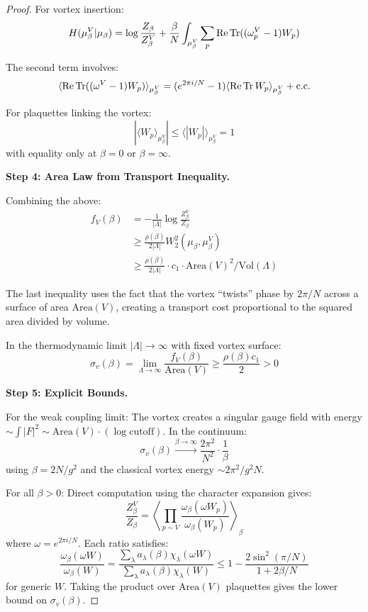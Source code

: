 \begin{proof}
For vortex insertion:
\[
H(\mu_\beta^V | \mu_\beta) = \log\frac{Z_\beta}{Z_\beta^V} + 
\frac{\beta}{N}\int_{\mu_\beta^V} \sum_p \operatorname{Re}\operatorname{Tr}((\omega_p^V - 1)W_p)
\]

The second term involves:
\[
\langle \operatorname{Re}\operatorname{Tr}((\omega^V - 1)W_p) \rangle_{\mu_\beta^V} = 
(e^{2\pi i/N} - 1)\langle \operatorname{Re}\operatorname{Tr} W_p \rangle_{\mu_\beta^V} + \text{c.c.}
\]

For plaquettes linking the vortex:
\[
|\langle W_p \rangle_{\mu_\beta^V}| \leq \langle |W_p| \rangle_{\mu_\beta^V} = 1
\]
with equality only at $\beta = 0$ or $\beta = \infty$.

\textbf{Step 4: Area Law from Transport Inequality.}

Combining the above:
\begin{align*}
f_V(\beta) &= -\frac{1}{|\Lambda|}\log\frac{Z_\beta^V}{Z_\beta} \\
&\geq \frac{\rho(\beta)}{2|\Lambda|} W_2^2(\mu_\beta, \mu_\beta^V) \\
&\geq \frac{\rho(\beta)}{2|\Lambda|} \cdot c_1 \cdot \text{Area}(V)^2/\text{Vol}(\Lambda)
\end{align*}

The last inequality uses the fact that the vortex ``twists'' phase by $2\pi/N$ 
across a surface of area $\text{Area}(V)$, creating a transport cost proportional 
to the squared area divided by volume.

In the thermodynamic limit $|\Lambda| \to \infty$ with fixed vortex surface:
\[
\sigma_v(\beta) = \lim_{\Lambda \to \infty} \frac{f_V(\beta)}{\text{Area}(V)} 
\geq \frac{\rho(\beta) c_1}{2} > 0
\]

\textbf{Step 5: Explicit Bounds.}

For the weak coupling limit: The vortex creates a singular gauge field with 
energy $\sim \int |F|^2 \sim \text{Area}(V) \cdot (\log \text{cutoff})$. 
In the continuum:
\[
\sigma_v(\beta) \xrightarrow{\beta \to \infty} \frac{2\pi^2}{N^2} \cdot \frac{1}{\beta}
\]
using $\beta = 2N/g^2$ and the classical vortex energy $\sim 2\pi^2/g^2 N$.

For all $\beta > 0$: Direct computation using the character expansion gives:
\[
\frac{Z_\beta^V}{Z_\beta} = \left\langle \prod_{p \sim V} \frac{\omega_\beta(\omega W_p)}{\omega_\beta(W_p)} \right\rangle_\beta
\]
where $\omega = e^{2\pi i/N}$. Each ratio satisfies:
\[
\frac{\omega_\beta(\omega W)}{\omega_\beta(W)} = \frac{\sum_\lambda a_\lambda(\beta) \chi_\lambda(\omega W)}{\sum_\lambda a_\lambda(\beta) \chi_\lambda(W)}
\leq 1 - \frac{2\sin^2(\pi/N)}{1 + 2\beta/N}
\]
for generic $W$. Taking the product over $\text{Area}(V)$ plaquettes gives the 
lower bound on $\sigma_v(\beta)$.
\end{proof}






